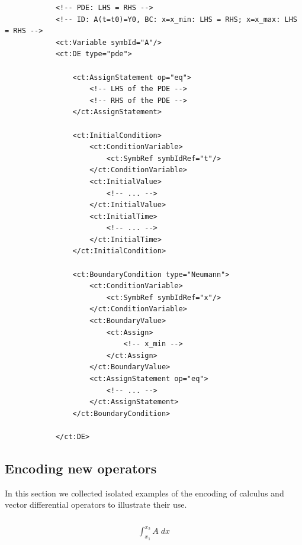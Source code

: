 \lstset{language=XML}
\begin{lstlisting}
            <!-- PDE: LHS = RHS -->
            <!-- ID: A(t=t0)=Y0, BC: x=x_min: LHS = RHS; x=x_max: LHS = RHS -->
            <ct:Variable symbId="A"/>
            <ct:DE type="pde">
            
                <ct:AssignStatement op="eq">
                    <!-- LHS of the PDE -->
                    <!-- RHS of the PDE -->
                </ct:AssignStatement>
                
                <ct:InitialCondition>
                    <ct:ConditionVariable>
                        <ct:SymbRef symbIdRef="t"/>
                    </ct:ConditionVariable>
                    <ct:InitialValue>
                        <!-- ... -->
                    </ct:InitialValue>
                    <ct:InitialTime>
                        <!-- ... -->
                    </ct:InitialTime>
                </ct:InitialCondition>
                
                <ct:BoundaryCondition type="Neumann">
                    <ct:ConditionVariable>
                        <ct:SymbRef symbIdRef="x"/>
                    </ct:ConditionVariable>
                    <ct:BoundaryValue>
                        <ct:Assign>
                            <!-- x_min -->
                        </ct:Assign>
                    </ct:BoundaryValue>
                    <ct:AssignStatement op="eq">
                        <!-- ... -->
                    </ct:AssignStatement>
                </ct:BoundaryCondition>
                
            </ct:DE>
\end{lstlisting}


\subsection{Encoding new operators}
In this section we collected  isolated examples of the encoding of calculus and vector 
differential operators to illustrate their use.

\subsubsection*{}

\begin{align}
\int_{x_1}^{x_2} A \; dx \nonumber 
\end{align}

